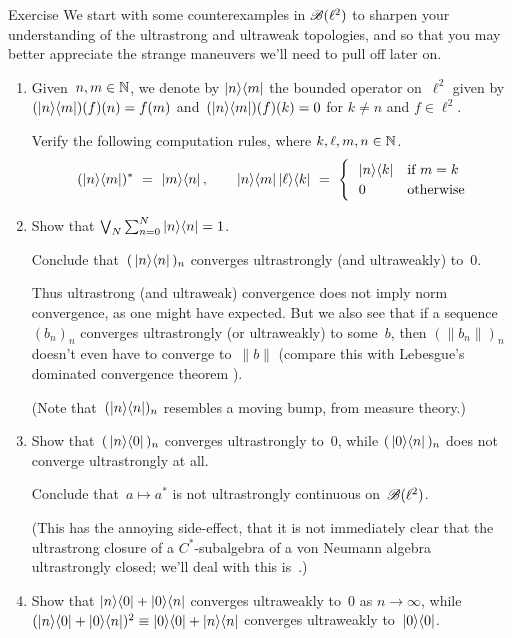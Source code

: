 \documentclass[a]{subfiles}
\begin{document}
\begin{parsec}%
\begin{point}{Exercise}%
We start with some counterexamples in $\mathscr{B}(\ell^2)$
to sharpen your understanding of the ultrastrong and ultraweak topologies,
and so that you may better appreciate
the strange maneuvers we'll need to pull off later on.
\begin{enumerate}
\item
Given~$n,m\in \mathbb{N}$,
we denote by $\left|n\right>\!\left<m\right|$
the bounded operator on~$\ell^2$
given by $(\left|n\right>\!\left<m\right|)(f)(n)=f(m)$
and~$(\left|n\right>\!\left<m\right|)(f)(k)=0$ for $k\neq n$
and $f\in \ell^2$.

Verify the following computation rules,
where $k,\ell,m,n\in \mathbb{N}$.
\begin{equation*}
(\ketbra{n}{m})^*\ =\ \ketbra{m}{n},
\qquad
\ketbra{n}{m}\ketbra{\ell}{k}\ =\ 
\begin{cases}
\ \ \ketbra{n}{k} & \text{if $m=k$} \\
\ \ 0 & \text{otherwise}
\end{cases}
\end{equation*}
\item
Show that $\bigvee_N \sum_{n=0}^N \left|n\right>\!\left<n\right|=1$.

Conclude that~$(\,\left|n\right>\!\left<n\right|\,)_n$
converges ultrastrongly (and ultraweakly) to~$0$.

Thus ultrastrong (and ultraweak) convergence does not imply norm convergence,
as one might have expected.
But we also see that if a sequence~$(b_n)_n$ converges ultrastrongly
(or ultraweakly) to some~$b$,
then $(\|b_n\|)_n$ doesn't even have to converge to~$\|b\|$
(compare this with Lebesgue's dominated convergence
theorem ).

(Note that~$(\left|n\right>\!\left<n\right|)_n$ resembles a moving bump, from measure theory.)
\item
Show that~$(\,\left|n\right>\!\left<0\right|\,)_n$ converges ultrastrongly to~$0$,
while $(\,\left|0\right>\!\left<n\right|\,)_n$ does not converge ultrastrongly at all.

Conclude that~$a\mapsto a^*$ is not ultrastrongly continuous 
on~$\mathscr{B}(\ell^2)$.

(This has the annoying side-effect,
that it is not immediately clear that the ultrastrong
closure of a $C^*$-subalgebra of a von Neumann algebra
ultrastrongly closed; we'll deal with this is~\TODO{}.)
\item
Show that $\left|n\right>\!\left<0\right|+\left|0\right>\!\left<n\right|$
converges ultraweakly to~$0$ as $n\to \infty$,
while $(\left|n\right>\!\left<0\right|+\left|0\right>\!\left<n\right|)^2\equiv \left|0\right>\!\left<0\right|+\left|n\right>\!\left<n\right|$
converges ultraweakly to~$\left|0\right>\!\left<0\right|$.


\end{enumerate}
\end{point}
\end{parsec}
\end{document}
